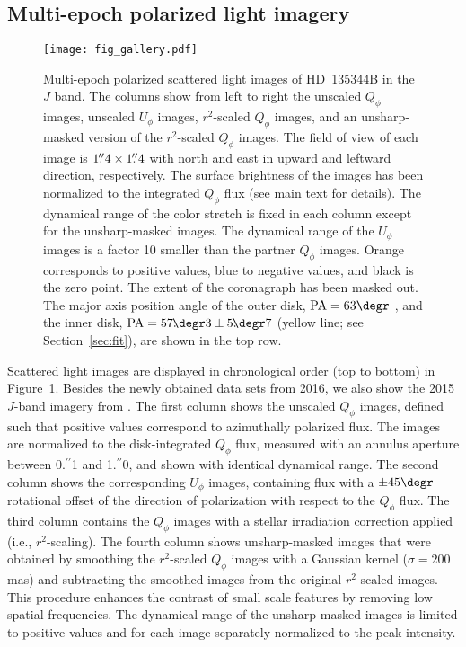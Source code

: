 \documentclass[twocolumn,tighten]{aastex61}
\newcommand{\ffdeg}{\mbox{\ensuremath{.\!\!\degr}}}
\newcommand{\ffarcs}{\mbox{\ensuremath{.\!\!^{\prime\prime}}}}
\begin{document}
\subsection{Multi-epoch polarized light imagery}\label{sec:imagery}

\begin{figure*}
\centering
\texttt{[image: fig\_gallery.pdf]}
\caption{Multi-epoch polarized scattered light images of HD~135344B in the $J$ band. The columns show from left to right the unscaled $Q_\phi$ images, unscaled $U_\phi$ images, $r^2$-scaled $Q_\phi$ images, and an unsharp-masked version of the $r^2$-scaled $Q_\phi$ images. The field of view of each image is $1\ffarcs4 \times 1\ffarcs4$ with north and east in upward and leftward direction, respectively. The surface brightness of the images has been normalized to the integrated $Q_\phi$ flux (see main text for details). The dynamical range of the color stretch is fixed in each column except for the unsharp-masked images. The dynamical range of the $U_\phi$ images is a factor 10 smaller than the partner $Q_\phi$ images. Orange corresponds to positive values, blue to negative values, and black is the zero point. The extent of the coronagraph has been masked out. The major axis position angle of the outer disk, ${\rm PA} = 63\degr$ \citep[purple line;][]{vandermarel2015}, and the inner disk, ${\rm PA} = 57\ffdeg3 \pm 5\ffdeg7$ (yellow line; see Section~\ref{sec:fit}), are shown in the top row.\label{fig:gallery}}
\end{figure*}

Scattered light images are displayed in chronological order (top to bottom) in Figure~\ref{fig:gallery}. Besides the newly obtained data sets from 2016, we also show the 2015 $J$-band imagery from \citet{stolker2016}. The first column shows the unscaled $Q_\phi$ images, defined such that positive values correspond to azimuthally polarized flux. The images are normalized to the disk-integrated $Q_\phi$ flux, measured with an annulus aperture between 0\ffarcs1 and 1\ffarcs0, and shown with identical dynamical range. The second column shows the corresponding $U_\phi$ images, containing flux with a $\pm45\degr$ rotational offset of the direction of polarization with respect to the $Q_\phi$ flux. The third column contains the $Q_\phi$ images with a stellar irradiation correction applied (i.e., $r^2$-scaling). The fourth column shows unsharp-masked images that were obtained by smoothing the $r^2$-scaled $Q_\phi$ images with a Gaussian kernel ($\sigma=200$\,mas) and subtracting the smoothed images from the original $r^2$-scaled images. This procedure enhances the contrast of small scale features by removing low spatial frequencies. The dynamical range of the unsharp-masked images is limited to positive values and for each image separately normalized to the peak intensity.
\end{document}
